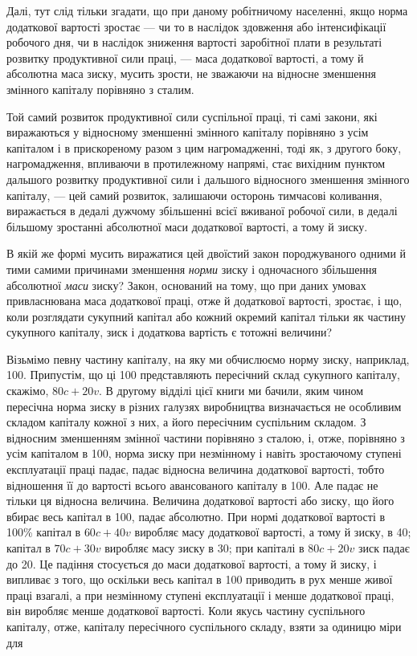 Далі, тут слід тільки згадати, що при даному робітничому населенні,
якщо норма додаткової вартості зростає — чи то в наслідок
здовження або інтенсифікації робочого дня, чи в наслідок зниження
вартості заробітної плати в результаті розвитку продуктивної
сили праці, — маса додаткової вартості, а тому й абсолютна
маса зиску, мусить зрости, не зважаючи на відносне
зменшення змінного капіталу порівняно з сталим.

Той самий розвиток продуктивної сили суспільної праці, ті самі
закони, які виражаються у відносному зменшенні змінного капіталу
порівняно з усім капіталом і в прискореному разом з цим нагромадженні,
тоді як, з другого боку, нагромадження, впливаючи
в протилежному напрямі, стає вихідним пунктом дальшого розвитку
продуктивної сили і дальшого відносного зменшення змінного
капіталу, — цей самий розвиток, залишаючи осторонь тимчасові
коливання, виражається в дедалі дужчому збільшенні
всієї вживаної робочої сили, в дедалі більшому зростанні абсолютної
маси додаткової вартості, а тому й зиску.

В якій же формі мусить виражатися цей двоїстий закон породжуваного
одними й тими самими причинами зменшення \emph{норми}
зиску і одночасного збільшення абсолютної \emph{маси} зиску? Закон,
оснований на тому, що при даних умовах привласнювана маса
додаткової праці, отже й додаткової вартості, зростає, і що, коли
розглядати сукупний капітал або кожний окремий капітал тільки
як частину сукупного капіталу, зиск і додаткова вартість є тотожні
величини?

Візьмімо певну частину капіталу, на яку ми обчислюємо
норму зиску, наприклад, 100. Припустім, що ці 100 представляють
пересічний склад сукупного капіталу, скажімо, $80c + 20v$.
В другому відділі цієї книги ми бачили, яким чином пересічна
норма зиску в різних галузях виробництва визначається не особливим
складом капіталу кожної з них, а його пересічним суспільним
складом. З відносним зменшенням змінної частини порівняно
з сталою, і, отже, порівняно з усім капіталом в 100, норма зиску
при незмінному і навіть зростаючому ступені експлуатації праці
падає, падає відносна величина додаткової вартості, тобто відношення
її до вартості всього авансованого капіталу в 100.
Але падає не тільки ця відносна величина. Величина додаткової
вартості або зиску, що його вбирає весь капітал в 100, падає
абсолютно. При нормі додаткової вартості в 100\% капітал в
$60c + 40v$ виробляє масу додаткової вартості, а тому й зиску,
в 40; капітал в $70c + 30v$ виробляє масу зиску в  30; при капіталі
в $80c + 20v$ зиск падає до 20. Це падіння стосується до
маси додаткової вартості, а тому й зиску, і випливає з того,
що оскільки весь капітал в 100 приводить в рух менше живої
праці взагалі, а при незмінному ступені експлуатації
і менше додаткової праці, він виробляє менше додаткової вартості.
Коли якусь частину суспільного капіталу, отже, капіталу
пересічного суспільного складу, взяти за одиницю міри для
\parbreak{}  %

